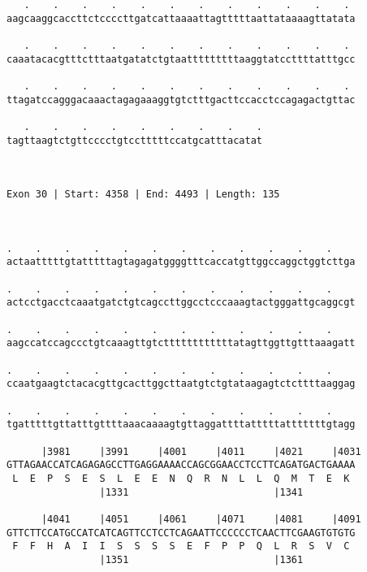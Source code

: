 \documentclass{article}
\begin{document}
\begin{Verbatim}
   .    .    .    .    .    .    .    .    .    .    .    . 
aagcaaggcaccttctccccttgatcattaaaattagtttttaattataaaagttatata
                                                            
   .    .    .    .    .    .    .    .    .    .    .    . 
caaatacacgtttctttaatgatatctgtaatttttttttaaggtatccttttatttgcc
                                                            
   .    .    .    .    .    .    .    .    .    .    .    . 
ttagatccagggacaaactagagaaaggtgtctttgacttccacctccagagactgttac
                                                            
   .    .    .    .    .    .    .    .    .
tagttaagtctgttcccctgtcctttttccatgcatttacatat
                                            
                                            
 
Exon 30 | Start: 4358 | End: 4493 | Length: 135



.    .    .    .    .    .    .    .    .    .    .    .    
actaatttttgtatttttagtagagatggggtttcaccatgttggccaggctggtcttga
                                                            
.    .    .    .    .    .    .    .    .    .    .    .    
actcctgacctcaaatgatctgtcagccttggcctcccaaagtactgggattgcaggcgt
                                                            
.    .    .    .    .    .    .    .    .    .    .    .    
aagccatccagccctgtcaaagttgtcttttttttttttatagttggttgtttaaagatt
                                                            
.    .    .    .    .    .    .    .    .    .    .    .    
ccaatgaagtctacacgttgcacttggcttaatgtctgtataagagtctcttttaaggag
                                                            
.    .    .    .    .    .    .    .    .    .    .    .    
tgatttttgttatttgttttaaacaaaagtgttaggattttatttttatttttttgtagg
                                                            
      |3981     |3991     |4001     |4011     |4021     |4031
GTTAGAACCATCAGAGAGCCTTGAGGAAAACCAGCGGAACCTCCTTCAGATGACTGAAAA
 L  E  P  S  E  S  L  E  E  N  Q  R  N  L  L  Q  M  T  E  K 
                |1331                         |1341         
  
      |4041     |4051     |4061     |4071     |4081     |4091
GTTCTTCCATGCCATCATCAGTTCCTCCTCAGAATTCCCCCCTCAACTTCGAAGTGTGTG
 F  F  H  A  I  I  S  S  S  S  E  F  P  P  Q  L  R  S  V  C 
                |1351                         |1361         
  

\end{Verbatim}
\end{document}
